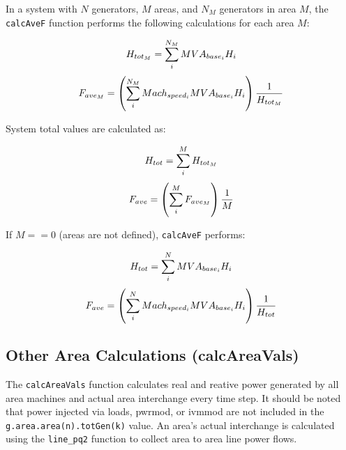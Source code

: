 \vspace{1em}
In a system with $N$ generators, $M$ areas, and $N_M$ generators in area $M$, the \verb|calcAveF| function performs the following calculations for each area $M$:

\begin{equation}{\label{eq: areaH} }
H_{tot_M} = \sum_{i}^{N_M} MVA_{base_i}H_i
\end{equation} 
\vspace{-1em}
\begin{equation}{\label{eq: areaF} }
F_{ave_M} = \left( \sum_{i}^{N_M}Mach_{speed_i}MVA_{base_i}H_i \right) \dfrac{1}{H_{tot_M}}
\end{equation}
\vspace{0.5 em}

\noindent System total values are calculated as:

\begin{equation}{\label{eq: systemH} }
H_{tot} = \sum_{i}^{M} H_{tot_M}
\end{equation} 
\vspace{-1em}
\begin{equation}{\label{eq: systemF} }
F_{ave} = \left( \sum_{i}^{M} F_{ave_M} \right) \dfrac{1}{M}
\end{equation}
\vspace{0.5 em}

\noindent If $M==0$ (areas are not defined), \verb|calcAveF| performs:

\begin{equation}{\label{eq: systemH2} }
H_{tot} = \sum_{i}^{N} MVA_{base_i}H_i 
\end{equation} 
\vspace{-1em}
\begin{equation}{\label{eq: systemF2} }
F_{ave} = \left( \sum_{i}^{N}Mach_{speed_i}MVA_{base_i}H_i \right) \dfrac{1}{H_{tot}}
\end{equation}\vspace{0.5 em}

\pagebreak
\subsection{Other Area Calculations (calcAreaVals)}  
The \verb|calcAreaVals| function calculates real and reative power generated by all area machines and actual area interchange every time step.
It should be noted that power injected via loads, pwrmod, or ivmmod are not included in the \verb|g.area.area(n).totGen(k)| value.
An area's actual interchange is calculated using the \verb|line_pq2| function to collect area to area line power flows.
